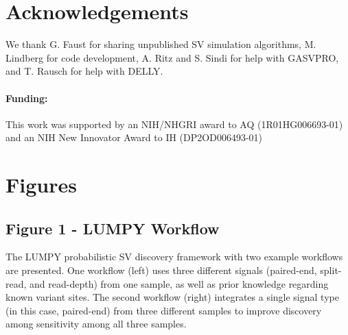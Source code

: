 \documentclass[10pt]{bmc_article}
\newenvironment{bmcformat}{\begin{raggedright}\baselineskip20pt\sloppy\setboolean{publ}{false}}{\end{raggedright}\baselineskip20pt\sloppy}
\begin{document}
\begin{bmcformat}
\section*{Acknowledgements}
We thank G. Faust for sharing unpublished SV simulation algorithms, M. Lindberg
for code development, A. Ritz and S. Sindi for help with GASVPRO, and T. Rausch
for help with DELLY.

\paragraph{Funding:} This work was supported by an NIH/NHGRI award to
AQ (1R01HG006693-01) and an NIH New Innovator Award to IH (DP2OD006493-01)

%
%

{
   }



\section*{Figures}
\subsection*{Figure 1 - LUMPY Workflow}
\begin{figure}
    \label{workflow:fig}
\end{figure}
The LUMPY probabilistic SV discovery framework with two example
workflows are presented. One workflow (left) uses three different signals
(paired-end, split-read, and read-depth) from one sample, as well as prior
knowledge regarding known variant sites. The second workflow (right) integrates
a single signal type (in this case, paired-end) from three different samples to
improve discovery among sensitivity among all three samples.


\end{bmcformat}
\end{document}
